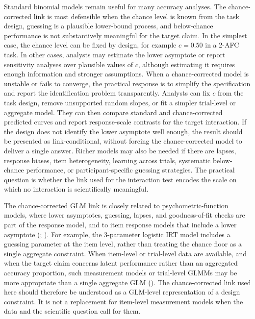 \documentclass[
  man,
  longtable,
  nolmodern,
  notxfonts,
  notimes,
  colorlinks=true,linkcolor=blue,citecolor=blue,urlcolor=blue]{apa7}
\begin{document}
Standard binomial models remain useful for many accuracy analyses. The
chance-corrected link is most defensible when the chance level is known
from the task design, guessing is a plausible lower-bound process, and
below-chance performance is not substantively meaningful for the target
claim. In the simplest case, the chance level can be fixed by design,
for example \(c = 0.50\) in a 2-AFC task. In other cases, analysts may
estimate the lower asymptote or report sensitivity analyses over
plausible values of \(c\), although estimating it requires enough
information and stronger assumptions. When a chance-corrected model is
unstable or fails to converge, the practical response is to simplify the
specification and report the identification problem transparently.
Analysts can fix \(c\) from the task design, remove unsupported random
slopes, or fit a simpler trial-level or aggregate model. They can then
compare standard and chance-corrected predicted curves and report
response-scale contrasts for the target interaction. If the design does
not identify the lower asymptote well enough, the result should be
presented as link-conditional, without forcing the chance-corrected
model to deliver a single answer. Richer models may also be needed if
there are lapses, response biases, item heterogeneity, learning across
trials, systematic below-chance performance, or participant-specific
guessing strategies. The practical question is whether the link used for
the interaction test encodes the scale on which no interaction is
scientifically meaningful.

The chance-corrected GLM link is closely related to
psychometric-function models, where lower asymptotes, guessing, lapses,
and goodness-of-fit checks are part of the response model, and to item
response models that include a lower asymptote
(;
). For example, the
3-parameter logistic IRT model includes a guessing parameter at the item
level, rather than treating the chance floor as a single aggregate
constraint. When item-level or trial-level data are available, and when
the target claim concerns latent performance rather than an aggregated
accuracy proportion, such measurement models or trial-level GLMMs may be
more appropriate than a single aggregate GLM
(). The
chance-corrected link used here should therefore be understood as a
GLM-level representation of a design constraint. It is not a replacement
for item-level measurement models when the data and the scientific
question call for them.
\end{document}

